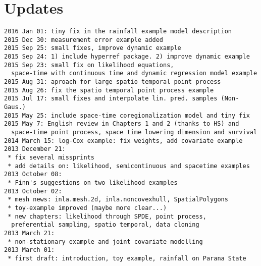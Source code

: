 \section{Updates}
\begin{verbatim}
2016 Jan 01: tiny fix in the rainfall example model description
2015 Dec 30: measurement error example added 
2015 Sep 25: small fixes, improve dynamic example
2015 Sep 24: 1) include hyperref package. 2) improve dynamic example
2015 Sep 23: small fix on likelihood equations, 
  space-time with continuous time and dynamic regression model example
2015 Aug 31: aproach for large spatio temporal point process 
2015 Aug 26: fix the spatio temporal point process example  
2015 Jul 17: small fixes and interpolate lin. pred. samples (Non-Gaus.)
2015 May 25: include space-time coregionalization model and tiny fix
2015 May 7: English review in Chapters 1 and 2 (thanks to HS) and 
  space-time point process, space time lowering dimension and survival
2014 March 15: log-Cox example: fix weights, add covariate example
2013 December 21: 
 * fix several missprints
 * add details on: likelihood, semicontinuous and spacetime examples 
2013 October 08: 
 * Finn's suggestions on two likelihood examples 
2013 October 02:
 * mesh news: inla.mesh.2d, inla.noncovexhull, SpatialPolygons 
 * toy-example improved (maybe more clear...) 
 * new chapters: likelihood through SPDE, point process, 
  preferential sampling, spatio temporal, data cloning
2013 March 21:
 * non-stationary example and joint covariate modelling
2013 March 01: 
 * first draft: introduction, toy example, rainfall on Parana State
\end{verbatim}
